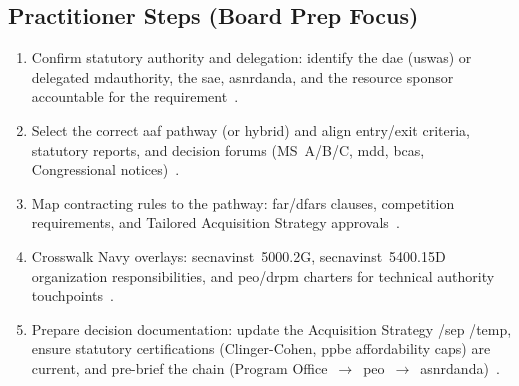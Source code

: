 \documentclass[../main.tex]{subfiles}
\begin{document}
\subsection{Practitioner Steps (Board Prep Focus)}
\begin{enumerate}
  \item Confirm statutory authority and delegation: identify the \ac{dae} (\ac{uswas}) or delegated \ac{mdauthority}, the \ac{sae}, \ac{asnrdanda}, and the resource sponsor accountable for the requirement~\autocite{DoDD5000-01,edo-3-3-1-acq-policy-players-2025,SECNAV5000-2G}.
  \item Select the correct \ac{aaf} pathway (or hybrid) and align entry/exit criteria, statutory reports, and decision forums (MS~A/B/C, \ac{mdd}, \acp{bca}, Congressional notices)~\autocite{DoDI5000-02,DoDI5000-85}.
  \item Map contracting rules to the pathway: \ac{far}/\ac{dfars} clauses, competition requirements, and Tailored Acquisition Strategy approvals~\autocite{FAR,DFARS,edo-3-3-1-acq-policy-players-2025}.
  \item Crosswalk Navy overlays: \ac{secnavinst}~5000.2G, \ac{secnavinst}~5400.15D organization responsibilities, and \ac{peo}/\ac{drpm} charters for technical authority touchpoints~\autocite{SECNAV5000-2G,SECNAV5400-15D}.
  \item Prepare decision documentation: update the Acquisition Strategy /\ac{sep} /\ac{temp}, ensure statutory certifications (Clinger-Cohen, \ac{ppbe} affordability caps) are current, and pre-brief the chain (Program Office~\(\rightarrow\)~\ac{peo}~\(\rightarrow\)~\ac{asnrdanda})~\autocite{DoDI5000-85,edo-3-3-1-acq-policy-players-2025}.
\end{enumerate}
\end{document}
